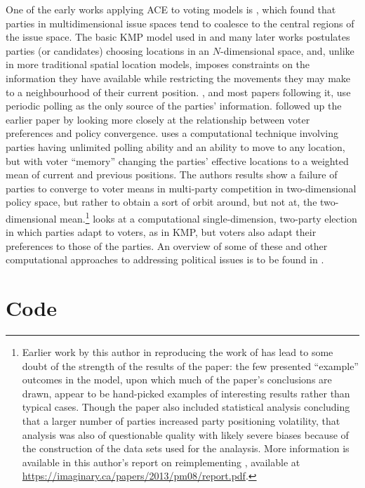 \documentclass[12pt]{article}
\numberwithin{equation}{subsection}
\begin{document}
One of the early works applying ACE to voting models is \citet{KMP92}, which found that parties in
multidimensional issue spaces tend to coalesce to the central regions of the issue space.  The basic
KMP model used in \citet{KMP92} and many later works postulates parties (or candidates) choosing
locations in an $N$-dimensional space, and, unlike in more traditional spatial location models,
imposes constraints on the information they have available while restricting the movements they may
make to a neighbourhood of their current position.  \citet{KMP92}, and most papers following it, use
periodic polling as the only source of the parties' information.  \citet{KMP98} followed up the
earlier paper by looking more closely at the relationship between voter preferences and policy
convergence.  \citet{Plumper08} uses a computational technique involving parties having unlimited
polling ability and an ability to move to any location, but with voter ``memory'' changing the
parties' effective locations to a weighted mean of current and previous positions.  The authors
results show a failure of parties to converge to voter means in multi-party competition in
two-dimensional policy space, but rather to obtain a sort of orbit around, but not at, the
two-dimensional mean.\footnote{
    Earlier work by this author in reproducing the work of \citet{Plumper08} has lead to some doubt
    of the strength of the results of the paper: the few presented ``example'' outcomes in the
    model, upon which much of the paper's conclusions are drawn, appear to be hand-picked examples
    of interesting results rather than typical cases.  Though the paper also included statistical
    analysis concluding that a larger number of parties increased party positioning volatility, that
    analysis was also of questionable quality with likely severe biases because of the construction
    of the data sets used for the analaysis.  More information is available in this author's report
    on reimplementing \citet{Plumper08}, available at
\url{https://imaginary.ca/papers/2013/pm08/report.pdf}.}
\citet{Jackson03} looks at a computational single-dimension, two-party election in which parties
adapt to voters, as in KMP, but voters also adapt their preferences to those of the parties.  An
overview of some of these and other computational approaches to addressing political issues is to be
found in \citet{Handbook29}.

\section{Code}
\end{document}
